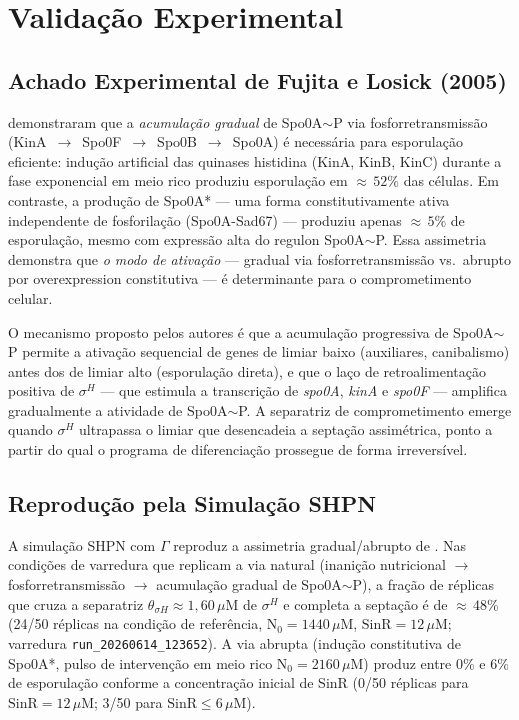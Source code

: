 \section{Validação Experimental}
\label{sec:validacao-experimental}

\subsection{Achado Experimental de Fujita e Losick (2005)}

\textcite{Fujita2005} demonstraram que a \emph{acumulação gradual}
de Spo0A${\sim}$P via fosforretransmissão (KinA~$\to$~Spo0F~$\to$~Spo0B~$\to$~Spo0A)
é necessária para esporulação eficiente: indução artificial das
quinases histidina (KinA, KinB, KinC) durante a fase exponencial
em meio rico produziu esporulação em ${\approx}\,52\%$ das células.
Em contraste, a produção de Spo0A* --- uma forma constitutivamente ativa
independente de fosforilação (Spo0A-Sad67) --- produziu apenas
${\approx}\,5\%$ de esporulação, mesmo com expressão alta do
regulon Spo0A${\sim}$P.
Essa assimetria demonstra que \emph{o modo de ativação} --- gradual
via fosforretransmissão vs.\ abrupto por overexpression constitutiva ---
é determinante para o comprometimento celular.

O mecanismo proposto pelos autores é que a acumulação progressiva
de Spo0A${\sim}$P permite a ativação sequencial de genes de limiar
baixo (auxiliares, canibalismo) antes dos de limiar alto (esporulação
direta), e que o laço de retroalimentação positiva de $\sigma^H$
--- que estimula a transcrição de \textit{spo0A}, \textit{kinA} e
\textit{spo0F} --- amplifica gradualmente a atividade de Spo0A${\sim}$P.
A separatriz de comprometimento emerge quando $\sigma^H$ ultrapassa o
limiar que desencadeia a septação assimétrica, ponto a partir do
qual o programa de diferenciação prossegue de forma irreversível.

\subsection{Reprodução pela Simulação SHPN}

A simulação SHPN com $\Gamma$ reproduz a assimetria gradual/abrupto
de \textcite{Fujita2005}.
Nas condições de varredura que replicam a via natural
(inanição nutricional $\to$ fosforretransmissão $\to$ acumulação
gradual de Spo0A${\sim}$P), a fração de réplicas que cruza
a separatriz $\theta_{\sigma H} \approx 1{,}60\,\mu$M de $\sigma^H$ e
completa a septação é de ${\approx}\,48\%$ (24/50 réplicas
na condição de referência, $\text{N}_0 = 1440\,\mu$M,
$\text{SinR} = 12\,\mu$M; varredura \texttt{run\_20260614\_123652}).
A via abrupta (indução constitutiva de Spo0A*, pulso de
intervenção em meio rico $\text{N}_0 = 2160\,\mu$M) produz entre
$0\%$ e $6\%$ de esporulação conforme a concentração inicial
de SinR (0/50 réplicas para $\text{SinR} = 12\,\mu$M;
3/50 para $\text{SinR} \leq 6\,\mu$M).

